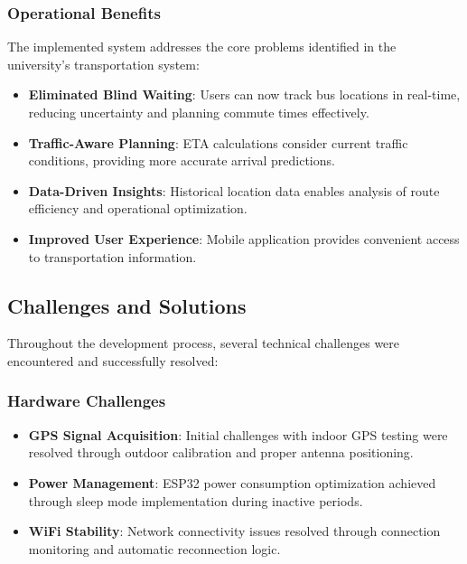 \documentclass[12pt,a4paper]{article}
\begin{document}
\subsubsection{Operational Benefits}

The implemented system addresses the core problems identified in the university's transportation system:

\begin{itemize}
    \item \textbf{Eliminated Blind Waiting}: Users can now track bus locations in real-time, reducing uncertainty and planning commute times effectively.
    
    \item \textbf{Traffic-Aware Planning}: ETA calculations consider current traffic conditions, providing more accurate arrival predictions.
    
    \item \textbf{Data-Driven Insights}: Historical location data enables analysis of route efficiency and operational optimization.
    
    \item \textbf{Improved User Experience}: Mobile application provides convenient access to transportation information.
\end{itemize}

\subsection{Challenges and Solutions}

Throughout the development process, several technical challenges were encountered and successfully resolved:

\subsubsection{Hardware Challenges}

\begin{itemize}
    \item \textbf{GPS Signal Acquisition}: Initial challenges with indoor GPS testing were resolved through outdoor calibration and proper antenna positioning.
    
    \item \textbf{Power Management}: ESP32 power consumption optimization achieved through sleep mode implementation during inactive periods.
    
    \item \textbf{WiFi Stability}: Network connectivity issues resolved through connection monitoring and automatic reconnection logic.
\end{itemize}
\end{document}

